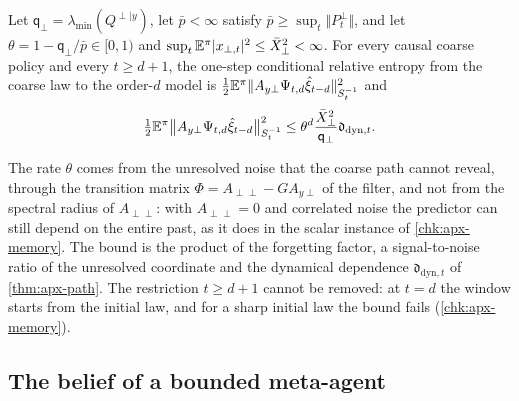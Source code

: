 \begin{theorem}\label{thm:apx-order-d}
Let $\mathsf q_\perp=\lambda_{\min}(Q^{\perp\mid y})$, let $\bar p<\infty$ satisfy $\bar p\ge\sup_t\Vert P^\perp_t\Vert$, and let $\theta=1-\mathsf q_\perp/\bar p\in[0,1)$ and $\sup_t\mathbb{E}^\pi\lvert x_{\perp,t}\rvert^2\le\bar X_\perp^2<\infty$. For every causal coarse policy and every $t\ge d+1$, the one-step conditional relative entropy from the coarse law to the order-$d$ model is $\frac12\mathbb{E}^\pi\Vert A_{y\perp}\Psi_{t,d}\hat\xi_{t-d}\Vert^2_{S_t^{-1}}$ and
\begin{equation}\label{eq:apx-order-d}
\tfrac12\mathbb{E}^\pi\bigl\Vert A_{y\perp}\Psi_{t,d}\hat\xi_{t-d}\bigr\Vert^2_{S_t^{-1}}\le\theta^d\frac{\bar X_\perp^2}{\mathsf q_\perp}\mathfrak d_{\mathrm{dyn},t} .
\end{equation}
\end{theorem}

The rate $\theta$ comes from the unresolved noise that the coarse path cannot reveal, through the transition matrix $\Phi=A_{\perp\perp}-GA_{y\perp}$ of the filter, and not from the spectral radius of $A_{\perp\perp}$: with $A_{\perp\perp}=0$ and correlated noise the predictor can still depend on the entire past, as it does in the scalar instance of \cref{chk:apx-memory}. The bound is the product of the forgetting factor, a signal-to-noise ratio of the unresolved coordinate and the dynamical dependence $\mathfrak d_{\mathrm{dyn},t}$ of \cref{thm:apx-path}. The restriction $t\ge d+1$ cannot be removed: at $t=d$ the window starts from the initial law, and for a sharp initial law the bound fails (\cref{chk:apx-memory}).

\subsection{The belief of a bounded meta-agent}

